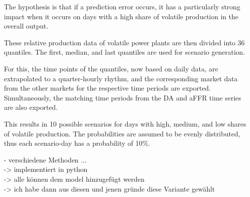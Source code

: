 The hypothesis is that if a prediction error occurs, it has a particularly strong impact when it occurs on days
with a high share of volatile production in the overall output.

These relative production data of volatile power plants are then divided into 36 quantiles.
The first, median, and last quantiles are used for scenario generation.

For this, the time points of the quantiles, now based on daily data, are extrapolated to a quarter-hourly rhythm,
and the corresponding market data from the other markets for the respective time periods are exported.
Simultaneously, the matching time periods from the DA and aFFR time series are also exported.

This results in 10 possible scenarios for days with high, medium, and low shares of volatile production.
The probabilities are assumed to be evenly distributed, thus each scenario-day has a probability of 10\%.








- verschiedene Methoden ...\\
-> implementiert in python\\
-> alle können dem model hinzugefügt werden\\
-> ich habe dann aus diesen und jenen gründe diese Variante gewählt\\
